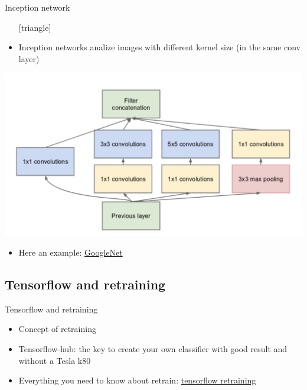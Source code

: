 \documentclass{beamer}
\begin{document}
\begin{frame}{Inception network}
	\begin{itemize}
		\setlength\itemsep{1em}
		[triangle]
		\item 
			Inception networks analize images with different kernel size (in the same conv layer)
	\end{itemize}
	\begin{center}
		\includegraphics[scale=0.28]{inception}
	\end{center}
	\begin{itemize}
		\setlength\itemsep{1em}
		[triangle]
		\item 
			Here an example: \href{https://bit.ly/2vBgoO3}{\color{red}GoogleNet}
	\end{itemize}
\end{frame}

\subsection{Tensorflow and retraining}

\begin{frame}{Tensorflow and retraining}
	\begin{itemize}
		\setlength\itemsep{1em}
		[triangle]
		\item 
			Concept of retraining
		\item 
			Tensorflow-hub: the key to create your own classifier with good result and without a Tesla k80
		\item 
			Everything you need to know about retrain: \href{https://www.tensorflow.org/hub/tutorials/						image_retraining}{\color{red}tensorflow retraining}
	\end{itemize}
\end{frame}
\end{document}
